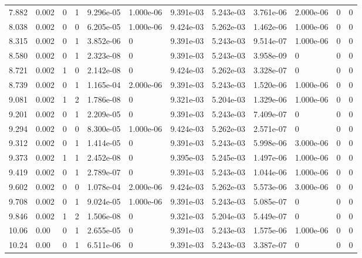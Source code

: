 \documentclass[preview]{standalone}
\begin{document}
{{{\begin{tabular}{L{1.2cm}C{1.2cm} C{0.3cm}C{0.5cm} C{1.4cm}C{1.4cm} C{1.4cm}C{1.4cm} C{1.6cm}C{1.6cm} C{1.6cm}C{1.6cm}}
  7.882  &  0.002  & 0     &  1 &  9.296e-05  & 1.000e-06  &  9.391e-03&   5.243e-03& 3.761e-06 & 2.000e-06   &  0 & 0  \\ 
  8.038  &  0.002  & 0     &  0 &  6.205e-05  & 1.000e-06  &  9.424e-03&   5.262e-03& 1.462e-06 & 1.000e-06   &  0 & 0  \\ 
  8.315  &  0.002  & 0     &  1 &  3.852e-06  & 0  &  9.391e-03&   5.243e-03& 9.514e-07 & 1.000e-06   &  0 & 0  \\ 
  8.580  &  0.002  & 0     &  1 &  2.323e-08  & 0  &  9.391e-03&   5.243e-03& 3.958e-09 & 0   &  0 & 0  \\ 
  8.721  &  0.002  & 1     &  0 &  2.142e-08  & 0  &  9.424e-03&   5.262e-03& 3.328e-07 & 0   &  0 & 0  \\ 
  8.739  &  0.002  & 0     &  1 &  1.165e-04  & 2.000e-06  &  9.391e-03&   5.243e-03& 1.520e-06 & 1.000e-06   &  0 & 0  \\ 
  9.081  &  0.002  & 1     &  2 &  1.786e-08  & 0  &  9.321e-03&   5.204e-03& 1.329e-06 & 1.000e-06   &  0 & 0  \\ 
  9.201  &  0.002  & 0     &  1 &  2.209e-05  & 0  &  9.391e-03&   5.243e-03& 7.409e-07 & 0   &  0 & 0  \\ 
  9.294  &  0.002  & 0     &  0 &  8.300e-05  & 1.000e-06  &  9.424e-03&   5.262e-03& 2.571e-07 & 0   &  0 & 0  \\ 
  9.312  &  0.002  & 0     &  1 &  1.414e-05  & 0  &  9.391e-03&   5.243e-03& 5.998e-06 & 3.000e-06   &  0 & 0  \\ 
  9.373  &  0.002  & 1     &  1 &  2.452e-08  & 0  &  9.395e-03&   5.245e-03& 1.497e-06 & 1.000e-06   &  0 & 0  \\ 
  9.419  &  0.002  & 0     &  1 &  2.789e-07  & 0  &  9.391e-03&   5.243e-03& 1.044e-06 & 1.000e-06   &  0 & 0  \\ 
  9.602  &  0.002  & 0     &  0 &  1.078e-04  & 2.000e-06  &  9.424e-03&   5.262e-03& 5.573e-06 & 3.000e-06   &  0 & 0  \\ 
  9.708  &  0.002  & 0     &  1 &  9.024e-05  & 1.000e-06  &  9.391e-03&   5.243e-03& 5.085e-07 & 0   &  0 & 0  \\ 
  9.846  &  0.002  & 1     &  2 &  1.506e-08  & 0  &  9.321e-03&   5.204e-03& 5.449e-07 & 0   &  0 & 0  \\ 
  10.06  &  0.00  & 0     &  1 &  2.655e-05  & 0  &  9.391e-03&   5.243e-03& 1.575e-06 & 1.000e-06   &  0 & 0  \\ 
  10.24  &  0.00  & 0     &  1 &  6.511e-06  & 0  &  9.391e-03&   5.243e-03& 3.387e-07 & 0   &  0 & 0  \\ 

\end{tabular}}}}
\end{document}
